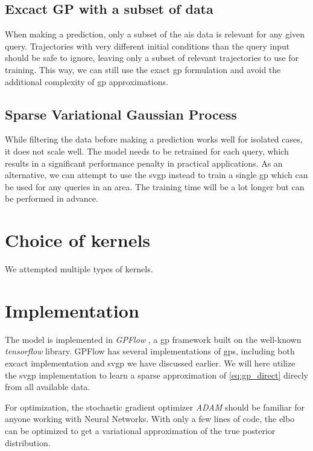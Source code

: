 \subsection{Excact GP with a subset of data}
When making a prediction, only a subset of the \acrshort{ais} data is relevant for any given query. Trajectories with very different initial conditions than the query input should be safe to ignore, leaving only a subset of relevant trajectories to use for training. This way, we can still use the exact \acrshort{gp} formulation and avoid the additional complexity of \acrshort{gp} approximations. 
\subsection{Sparse Variational Gaussian Process}
While filtering the data before making a prediction works well for isolated cases, it does not scale well. The model needs to be retrained for each query, which results in a significant performance penalty in practical applications. As an alternative, we can attempt to use the \acrshort{svgp} instead to train a single \acrshort{gp} which can be used for any queries in an area. The training time will be a lot longer but can be performed in advance. 

\section{Choice of kernels}

We attempted multiple types of kernels. 

\section{Implementation}
The model is implemented in \textit{GPFlow} \cite{GPflow2017}, a \acrshort{gp} framework built on the well-known \textit{tensorflow} \cite{tensorflow2015-whitepaper} library. GPFlow has several implementations of \acrshort{gp}s, including both excact implementation and \acrshort{svgp} we have discussed earlier. We will here utilize the \acrshort{svgp} implementation to learn a sparse approximation of \cref{eq:gp_direct} direcly from all available data. 

For optimization, the stochastic gradient optimizer \textit{ADAM} should be familiar for anyone working with Neural Networks. With only a few lines of code, the \acrshort{elbo} can be optimized to get a variational approximation of the true posterior distribution.

